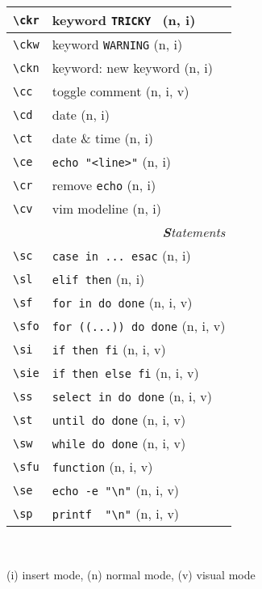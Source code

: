 \documentclass[oneside,12pt,a4paper,DIV18]{scrartcl}
\begin{document}
\begin{center}
\begin{tabular}[]{|p{11mm}|p{59mm}|}
\hline \verb'\ckr' & keyword \verb'TRICKY '           \hfill (n, i) \\
\hline \verb'\ckw' & keyword \verb'WARNING'           \hfill (n, i) \\
\hline \verb'\ckn' & keyword: new keyword             \hfill (n, i) \\
\hline \verb'\cc'  & toggle comment                   \hfill (n, i, v) \\
\hline \verb'\cd'  & date                             \hfill (n, i) \\
\hline \verb'\ct'  & date \& time                     \hfill (n, i) \\
\hline \verb'\ce'  & \verb'echo "<line>"'             \hfill (n, i) \\
\hline \verb'\cr'  & remove \verb'echo'               \hfill (n, i) \\
\hline \verb'\cv'  & vim modeline                     \hfill (n, i) \\
\hline 
\hline
\multicolumn{2}{|r|}{\textsl{\textbf{S}tatements}} \\
\hline \verb'\sc'  & \verb'case in ... esac'    \hfill (n, i) \\
\hline \verb'\sl'  & \verb'elif then'           \hfill (n, i) \\
\hline \verb'\sf'  & \verb'for in do done'      \hfill (n, i, v) \\
\hline \verb'\sfo' & \verb'for ((...)) do done'      \hfill (n, i, v) \\
\hline \verb'\si'  & \verb'if then fi'          \hfill (n, i, v) \\
\hline \verb'\sie' & \verb'if then else fi'     \hfill (n, i, v) \\
\hline \verb'\ss'  & \verb'select in do done'   \hfill (n, i, v) \\
\hline \verb'\st'  & \verb'until do done'       \hfill (n, i, v) \\
\hline \verb'\sw'  & \verb'while do done'       \hfill (n, i, v) \\
\hline \verb'\sfu' & \verb'function'            \hfill (n, i, v) \\
\hline \verb'\se'  & \verb'echo -e "\n"'        \hfill (n, i, v) \\
\hline \verb'\sp'  & \verb'printf  "\n"'        \hfill (n, i, v) \\
\hline
\end{tabular} \\
\begin{flushleft}
{\small
{\normalsize (i)} insert mode, {\normalsize (n)} normal mode, {\normalsize (v)} visual mode
}%
\end{flushleft}


\end{center}
\end{document}
